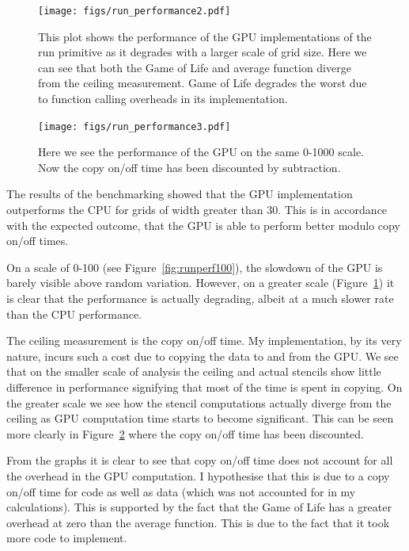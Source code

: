 \documentclass[12pt,a4paper,twoside]{scrbook}
\begin{document}
\begin{figure}[h]
  \texttt{[image: figs/run\_performance2.pdf]}
  \caption{This plot shows the performance of the GPU implementations of the run
    primitive as it degrades with a larger scale of grid size. Here we can see
    that both the Game of Life and average function diverge from the ceiling
    measurement. Game of Life degrades the worst due to function calling
    overheads in its implementation.}
  \label{fig:runperf1000}
\end{figure}

\begin{figure}[h]
  \texttt{[image: figs/run\_performance3.pdf]}
  \caption{Here we see the performance of the GPU on the same 0-1000 scale. Now
    the copy on/off time has been discounted by subtraction.}
  \label{fig:runperf1000dis}
\end{figure}

The results of the benchmarking showed that the GPU implementation outperforms
the CPU for grids of width greater than 30. This is in accordance with the
expected outcome, that the GPU is able to perform better modulo copy on/off times.

On a scale of 0-100 (see Figure~\ref{fig:runperf100}), the slowdown of the GPU
is barely visible above random variation. However, on a greater scale
(Figure~\ref{fig:runperf1000}) it is clear that the performance is actually
degrading, albeit at a much slower rate than the CPU performance.

The ceiling measurement is the copy on/off time. My implementation, by its very
nature, incurs such a cost due to copying the data to and from the GPU. We see
that on the smaller scale of analysis the ceiling and actual stencils show
little difference in performance signifying that most of the time is spent in
copying. On the greater scale we see how the stencil computations actually
diverge from the ceiling as GPU computation time starts to become
significant. This can be seen more clearly in Figure~\ref{fig:runperf1000dis}
where the copy on/off time has been discounted.

From the graphs it is clear to see that copy on/off time does not account for
all the overhead in the GPU computation. I hypothesise that this is due to a
copy on/off time for code as well as data (which was not accounted for in my
calculations). This is supported by the fact that the Game of Life has a greater
overhead at zero than the average function. This is due to the fact that it took
more code to implement.
\end{document}
